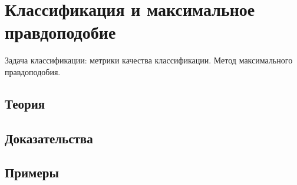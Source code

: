 
\section{Классификация и максимальное правдоподобие}
\label{sec:1.4.04-classification-mle}

\begin{ticket}
Задача классификации: метрики качества классификации. Метод максимального правдоподобия.
\end{ticket}

\subsection*{Теория}

\subsection*{Доказательства}

\subsection*{Примеры}
